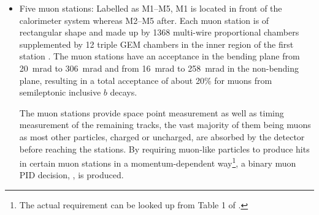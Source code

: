 \begin{itemize}
    \item Five muon stations:
        Labelled as M1--M5, M1 is located in front of the calorimeter system
        whereas M2--M5 after.
        Each muon station is of rectangular shape and made up by 1368
        multi-wire proportional chambers supplemented by 12 triple GEM chambers
        in the inner region of the first station \cite{Belyaev_2021}.
        The muon stations have an acceptance in the bending plane from
        20~mrad to 306~mrad and from 16~mrad to 258~mrad in the non-bending
        plane, resulting in a total acceptance of about 20\% for muons from
        semileptonic inclusive $b$ decays.

        The muon stations provide space point measurement
        as well as timing measurement of the remaining tracks, the vast majority
        of them being muons as most other particles,
        charged or uncharged, are absorbed by the detector before reaching the
        stations.
        By requiring muon-like particles to produce hits in certain muon
        stations in a momentum-dependent way\footnote{
            The actual requirement can be looked up from Table 1 of
            \cite{LHCB-DP-2013-001}.
        },
        a binary muon PID decision, \isMuon, is produced.
\end{itemize}

